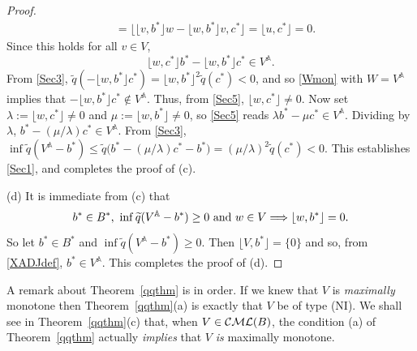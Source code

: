 \documentclass[letterpaper]{article}
\theoremstyle{plain}
\theoremstyle{definition}
\numberwithin{equation}{section}
\newcommand{\A}{{\mathbb A}}
\newcommand{\CML}{{\cal CML}}
\newcommand{\lr}{\Longrightarrow}
\newcommand{\qt}{\wt q}
\newcommand{\wt}{\widetilde}
\newcommand{\xbra}[2]{\lfloor#1,#2\rfloor}
\newcommand{\Xbra}[2]{\big\lfloor#1,#2\big\rfloor}
\newcommand{\Thm}{Theorem~\ref}
\begin{document}
\begin{proof}
\begin{align*}
&= \Xbra{\xbra{v}{b^*}w - \xbra{w}{b^*}v}{c^*} = \xbra{u}{c^*} = 0.
\end{align*}
%
Since this holds for all $v\in V$,
\begin{equation}\label{Sec5}
\xbra{w}{c^*}b^* - \xbra{w}{b^*}c^* \in V^\A.
\end{equation}
%
From \eqref{Sec3}, $\qt(-\xbra{w}{b^*}c^*) = \xbra{w}{b^*}^2\qt(c^*) < 0$, and so \eqref{Wmon} with $W = V^\A$ implies that $- \xbra{w}{b^*}c^* \not\in V^\A$.   Thus, from \eqref{Sec5}, $\xbra{w}{c^*} \ne 0$.   Now set $\lambda := \xbra{w}{c^*} \neq 0$ and $\mu := \xbra{w}{b^*} \neq 0$, so  
\eqref{Sec5} reads $\lambda b^* - \mu c^* \in V^\A$.   Dividing by $\lambda$, $b^* - (\mu/\lambda) c^* \in V^\A$.
%
From \eqref{Sec3}, $\inf\qt(V^\A - b^*) \le \qt\big(b^* -  (\mu/\lambda)c^* - b^*\big)  = {(\mu/\lambda)^2}\qt(c^*) < 0$.   This establishes \eqref{Sec1}, and completes the proof of (c).\par
(d) It is immediate from (c) that 
%
$$b^* \in B^*,\ \inf\qt(V^\A - b^*) \ge 0 \hbox{ and }w \in V \lr \xbra{w}{b^*} = 0.$$
%
So let $b^* \in B^*$ and $\inf\qt(V^\A - b^*) \ge 0$.   Then $\xbra{V}{b^*} = \{0\}$ and so, from \eqref{XADJdef}, $b^* \in V^\A$.   This completes the proof of (d).
\end{proof}
%
A remark about \Thm{qqthm} is in order.   If we knew that $V$ is {\em maximally} monotone then \Thm{qqthm}(a) is exactly that $V$ be of type (NI).   We shall see in  \Thm{qqthm}(c) that, when  $V \in \CML(B)$, the condition (a) of \Thm{qqthm} actually {\em implies} that $V$ {\em is} maximally monotone.
\end{document}
